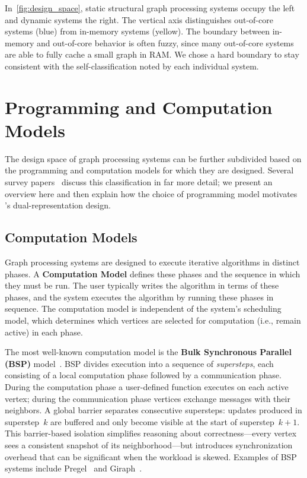 In~\autoref{fig:design_space}, static structural graph processing systems occupy the left and dynamic systems the right. 
The vertical axis distinguishes out-of-core systems (blue) from in-memory systems (yellow).
The boundary between in-memory and out-of-core behavior is often fuzzy, since many out-of-core systems are able to fully cache a small graph in RAM.
We chose a hard boundary to stay consistent with the self-classification noted by each individual system.


\section{Programming and Computation Models}
\label{design:programming_vs_computation}
The design space of graph processing systems can be further subdivided based on the programming and computation models for which they are designed.
Several survey papers~\cite{mccune2015tlavSurvey, Heidari:2018:SGP:3212709.3199523} discuss this classification in far more detail; we present an overview here and then explain how the choice of programming model motivates \project{}'s dual-representation design.

\subsection{Computation Models}
\label{design:comp_models}

Graph processing systems are designed to execute iterative algorithms in distinct phases.
A \textbf{Computation Model} defines these phases and the sequence in which they must be run.
The user typically writes the algorithm in terms of these phases, and the system executes the algorithm by running these phases in sequence.
The computation model is independent of the system's scheduling model, which determines which vertices are selected for computation (i.e., remain active) in each phase.

The most well-known computation model is the \textbf{Bulk Synchronous Parallel (BSP)} model~\cite{valiant1990bridging}.
BSP divides execution into a sequence of \emph{supersteps}, each consisting of a local computation phase followed by a communication phase.
During the computation phase a user-defined function executes on each active vertex; during the communication phase vertices exchange messages with their neighbors.
A global barrier separates consecutive supersteps: updates produced in superstep~$k$ are buffered and only become visible at the start of superstep~$k{+}1$.
This barrier-based isolation simplifies reasoning about correctness---every vertex sees a consistent snapshot of its neighborhood---but introduces synchronization overhead that can be significant when the workload is skewed.
Examples of BSP systems include Pregel~\cite{malewicz2010pregel} and Giraph~\cite{giraph}.

